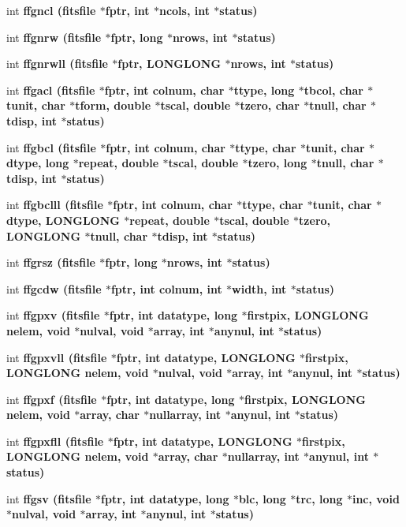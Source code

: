 \begin{CompactItemize}
\item 
int \bf{ffgncl} (\bf{fitsfile} $\ast$fptr, int $\ast$ncols, int $\ast$status)
\item 
int \bf{ffgnrw} (\bf{fitsfile} $\ast$fptr, long $\ast$nrows, int $\ast$status)
\item 
int \bf{ffgnrwll} (\bf{fitsfile} $\ast$fptr, \bf{LONGLONG} $\ast$nrows, int $\ast$status)
\item 
int \bf{ffgacl} (\bf{fitsfile} $\ast$fptr, int colnum, char $\ast$ttype, long $\ast$tbcol, char $\ast$tunit, char $\ast$tform, double $\ast$tscal, double $\ast$tzero, char $\ast$tnull, char $\ast$tdisp, int $\ast$status)
\item 
int \bf{ffgbcl} (\bf{fitsfile} $\ast$fptr, int colnum, char $\ast$ttype, char $\ast$tunit, char $\ast$dtype, long $\ast$repeat, double $\ast$tscal, double $\ast$tzero, long $\ast$tnull, char $\ast$tdisp, int $\ast$status)
\item 
int \bf{ffgbclll} (\bf{fitsfile} $\ast$fptr, int colnum, char $\ast$ttype, char $\ast$tunit, char $\ast$dtype, \bf{LONGLONG} $\ast$repeat, double $\ast$tscal, double $\ast$tzero, \bf{LONGLONG} $\ast$tnull, char $\ast$tdisp, int $\ast$status)
\item 
int \bf{ffgrsz} (\bf{fitsfile} $\ast$fptr, long $\ast$nrows, int $\ast$status)
\item 
int \bf{ffgcdw} (\bf{fitsfile} $\ast$fptr, int colnum, int $\ast$width, int $\ast$status)
\item 
int \bf{ffgpxv} (\bf{fitsfile} $\ast$fptr, int \bf{datatype}, long $\ast$firstpix, \bf{LONGLONG} nelem, void $\ast$nulval, void $\ast$array, int $\ast$anynul, int $\ast$status)
\item 
int \bf{ffgpxvll} (\bf{fitsfile} $\ast$fptr, int \bf{datatype}, \bf{LONGLONG} $\ast$firstpix, \bf{LONGLONG} nelem, void $\ast$nulval, void $\ast$array, int $\ast$anynul, int $\ast$status)
\item 
int \bf{ffgpxf} (\bf{fitsfile} $\ast$fptr, int \bf{datatype}, long $\ast$firstpix, \bf{LONGLONG} nelem, void $\ast$array, char $\ast$nullarray, int $\ast$anynul, int $\ast$status)
\item 
int \bf{ffgpxfll} (\bf{fitsfile} $\ast$fptr, int \bf{datatype}, \bf{LONGLONG} $\ast$firstpix, \bf{LONGLONG} nelem, void $\ast$array, char $\ast$nullarray, int $\ast$anynul, int $\ast$status)
\item 
int \bf{ffgsv} (\bf{fitsfile} $\ast$fptr, int \bf{datatype}, long $\ast$blc, long $\ast$trc, long $\ast$inc, void $\ast$nulval, void $\ast$array, int $\ast$anynul, int $\ast$status)

\end{CompactItemize}

